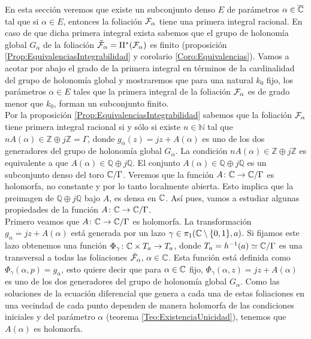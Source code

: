 En esta sección veremos que existe un subconjunto denso $E$ de parámetros $\alpha\in\overline{\mathbb{C}}$ tal que si $\alpha\in E$, entonces la foliación $\mathcal{F}_{\alpha}$ tiene una primera integral racional. En caso de que dicha primera integral exista sabemos que el grupo de holonomía global $G_{\alpha}$ de la foliación $\tilde{\mathcal{F}}_{\alpha}=\Pi^{*}(\mathcal{F}_{\alpha})$ es finito (proposición \ref{Prop:EquivalenciasIntegrabilidad} y corolario \ref{Coro:Equivalencias}). Vamos a acotar por abajo el grado de la primera integral en términos de la cardinalidad del grupo de holonomía global y mostraremos que para una natural $k_{0}$ fijo, los parámetros $\alpha\in E$ tales que la primera integral de la foliación $\mathcal{F}_{\alpha}$ es de grado menor que $k_{0}$, forman un subconjunto finito.\\

Por la proposición \ref{Prop:EquivalenciasIntegrabilidad} sabemos que la foliación $\mathcal{F}_{\alpha}$ tiene primera integral racional si y sólo si existe $n\in\mathbb{N}$ tal que $nA(\alpha)\in\mathbb{Z}\oplus j\mathbb{Z}=\Gamma$, donde $g_{\alpha}(z)=jz+A(\alpha)$ es uno de los dos generadores del grupo de holonomía global $G_{\alpha}$. La condición $nA(\alpha)\in\mathbb{Z}\oplus j\mathbb{Z}$ es equivalente a que $A(\alpha)\in\mathbb{Q}\oplus j\mathbb{Q}$. El conjunto $A(\alpha)\in\mathbb{Q}\oplus j\mathbb{Q}$ es un subconjunto denso del toro $\mathbb{C}/\Gamma$. Veremos que la función $A\colon\mathbb{C}\rightarrow\mathbb{C}/\Gamma$ es holomorfa, no constante y por lo tanto localmente abierta. Esto implica que la preimagen de $\mathbb{Q}\oplus j\mathbb{Q}$ bajo $A$, es densa en $\mathbb{C}$. Así pues, vamos a estudiar algunas propiedades de la función $A\colon\mathbb{C}\rightarrow \mathbb{C}/\Gamma$.\\

Primero veamos que $A\colon\mathbb{C}\rightarrow\mathbb{C}/\Gamma$ es holomorfa. La transformación $g_{\alpha}=jz+A(\alpha)$ está generada por un lazo $\gamma\in\pi_{1}(\mathbb{C}\setminus\{0,1\},a)$. Si fijamos este lazo obtenemos una función $\Phi_{\gamma}\colon\mathbb{C}\times T_{a}\rightarrow T_{a}$, donde $T_{a}=h^{-1}(a)\simeq\mathbb{C}/\Gamma$ es una transversal a todas las foliaciones $\tilde{\mathcal{F}}_{\alpha},\, \alpha\in\mathbb{C}$. Esta función está definida como $\Phi_{\gamma}(\alpha,p)=g_{\alpha}$, esto quiere decir que para $\alpha\in\mathbb{C}$ fijo, $\Phi_{\gamma}(\alpha,z)=jz+A(\alpha)$ es uno de los dos generadores del grupo de holonomía global $G_{\alpha}$. Como las soluciones de la ecuación diferencial que genera a cada una de estas foliaciones en una vecindad de cada punto dependen de manera holomorfa de las condiciones iniciales y del parámetro $\alpha$ (teorema \ref{Teo:ExistenciaUnicidad}), tenemos que $A(\alpha)$ es holomorfa.\\

